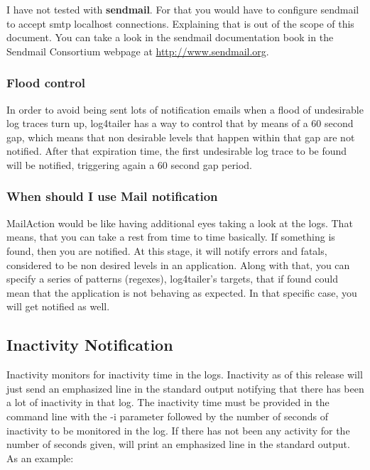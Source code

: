 I have not tested \logftailer{} 
with \textbf{sendmail}. For that you would have to configure sendmail to accept smtp localhost connections. 
Explaining that is out of the scope of this document. You can take a look in the sendmail documentation 
book in the Sendmail Consortium webpage at \href{http://www.sendmail.org}{http://www.sendmail.org}.

\subsubsection{Flood control}
In order to avoid being sent lots of notification emails when a flood of undesirable log traces
turn up, log4tailer has a way to control that by means of a 60 second gap, which means that non desirable 
levels that happen within that gap are not notified. After that expiration time, the first undesirable log 
trace to be found will be notified, triggering again a 60 second gap period. 
 
\subsubsection{When should I use Mail notification}

MailAction would be like having additional eyes taking a look at the logs. That means, that you can take 
a rest from time to time basically. If something is found, then 
you are notified. At this stage, it will notify errors and fatals, considered to be non desired levels in 
an application. Along with that, you can specify a series of patterns (regexes), log4tailer's targets,
that if found could mean that the application is not behaving as expected. In that specific case, you will 
get notified as well.
  
\subsection{Inactivity Notification}
\label{sec:inactivitysection}
Inactivity monitors for inactivity time in the logs. Inactivity as of this release 
will just send an emphasized line in the standard output notifying that there has been 
a lot of inactivity in that log. The inactivity time must be provided in the command line 
with the -i parameter followed by the number of seconds of inactivity to be monitored in the log.
If there has not been any activity for the number of seconds given, \logftailer{} will print 
an emphasized line in the standard output.\\
As an example:\\
 
